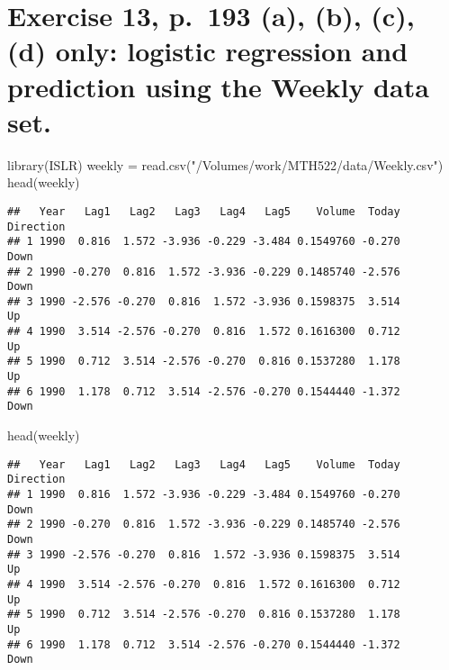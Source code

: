 \documentclass[
]{article}
\author{}
\date{\vspace{-2.5em}}
\newenvironment{Shaded}{\begin{snugshade}}{\end{snugshade}}
\newcommand{\FunctionTok}[1]{\textcolor[rgb]{0.00,0.00,0.00}{#1}}
\newcommand{\NormalTok}[1]{#1}
\newcommand{\OtherTok}[1]{\textcolor[rgb]{0.56,0.35,0.01}{#1}}
\newcommand{\StringTok}[1]{\textcolor[rgb]{0.31,0.60,0.02}{#1}}
\begin{document}
\hypertarget{exercise-13-p.-193-a-b-c-d-only-logistic-regression-and-prediction-using-the-weekly-data-set.}{%
\section{Exercise 13, p.~193 (a), (b), (c), (d) only: logistic
regression and prediction using the Weekly data
set.}\label{exercise-13-p.-193-a-b-c-d-only-logistic-regression-and-prediction-using-the-weekly-data-set.}}

\begin{Shaded}
\begin{Highlighting}[]
\FunctionTok{library}\NormalTok{(ISLR)}
\NormalTok{weekly }\OtherTok{=} \FunctionTok{read.csv}\NormalTok{(}\StringTok{"/Volumes/work/MTH522/data/Weekly.csv"}\NormalTok{)}
\FunctionTok{head}\NormalTok{(weekly)}
\end{Highlighting}
\end{Shaded}

\begin{verbatim}
##   Year   Lag1   Lag2   Lag3   Lag4   Lag5    Volume  Today Direction
## 1 1990  0.816  1.572 -3.936 -0.229 -3.484 0.1549760 -0.270      Down
## 2 1990 -0.270  0.816  1.572 -3.936 -0.229 0.1485740 -2.576      Down
## 3 1990 -2.576 -0.270  0.816  1.572 -3.936 0.1598375  3.514        Up
## 4 1990  3.514 -2.576 -0.270  0.816  1.572 0.1616300  0.712        Up
## 5 1990  0.712  3.514 -2.576 -0.270  0.816 0.1537280  1.178        Up
## 6 1990  1.178  0.712  3.514 -2.576 -0.270 0.1544440 -1.372      Down
\end{verbatim}

\begin{Shaded}
\begin{Highlighting}[]
\FunctionTok{head}\NormalTok{(weekly)}
\end{Highlighting}
\end{Shaded}

\begin{verbatim}
##   Year   Lag1   Lag2   Lag3   Lag4   Lag5    Volume  Today Direction
## 1 1990  0.816  1.572 -3.936 -0.229 -3.484 0.1549760 -0.270      Down
## 2 1990 -0.270  0.816  1.572 -3.936 -0.229 0.1485740 -2.576      Down
## 3 1990 -2.576 -0.270  0.816  1.572 -3.936 0.1598375  3.514        Up
## 4 1990  3.514 -2.576 -0.270  0.816  1.572 0.1616300  0.712        Up
## 5 1990  0.712  3.514 -2.576 -0.270  0.816 0.1537280  1.178        Up
## 6 1990  1.178  0.712  3.514 -2.576 -0.270 0.1544440 -1.372      Down
\end{verbatim}
\end{document}
